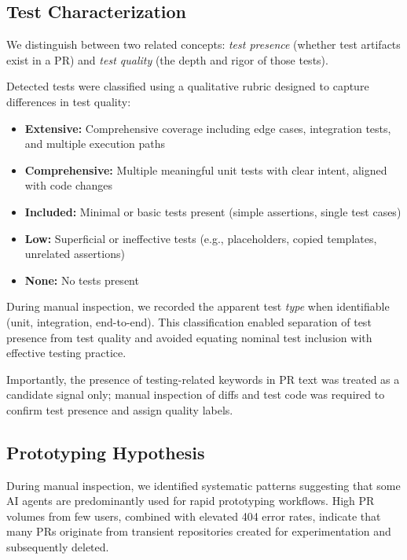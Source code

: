 \documentclass[conference]{IEEEtran}
\begin{document}
\subsection{Test Characterization}

We distinguish between two related concepts: \textit{test presence} (whether test artifacts exist in a PR) and \textit{test quality} (the depth and rigor of those tests).

Detected tests were classified using a qualitative rubric designed to capture differences in test quality:

\begin{itemize}
    \item \textbf{Extensive:} Comprehensive coverage including edge cases, integration tests, and multiple execution paths
    \item \textbf{Comprehensive:} Multiple meaningful unit tests with clear intent, aligned with code changes
    \item \textbf{Included:} Minimal or basic tests present (simple assertions, single test cases)
    \item \textbf{Low:} Superficial or ineffective tests (e.g., placeholders, copied templates, unrelated assertions)
    \item \textbf{None:} No tests present
\end{itemize}

During manual inspection, we recorded the apparent test \textit{type} when identifiable (unit, integration, end-to-end). This classification enabled separation of test presence from test quality and avoided equating nominal test inclusion with effective testing practice.

Importantly, the presence of testing-related keywords in PR text was treated as a candidate signal only; manual inspection of diffs and test code was required to confirm test presence and assign quality labels.

\subsection{Prototyping Hypothesis}

During manual inspection, we identified systematic patterns suggesting that some AI agents are predominantly used for rapid prototyping workflows. High PR volumes from few users, combined with elevated 404 error rates, indicate that many PRs originate from transient repositories created for experimentation and subsequently deleted.
\end{document}
